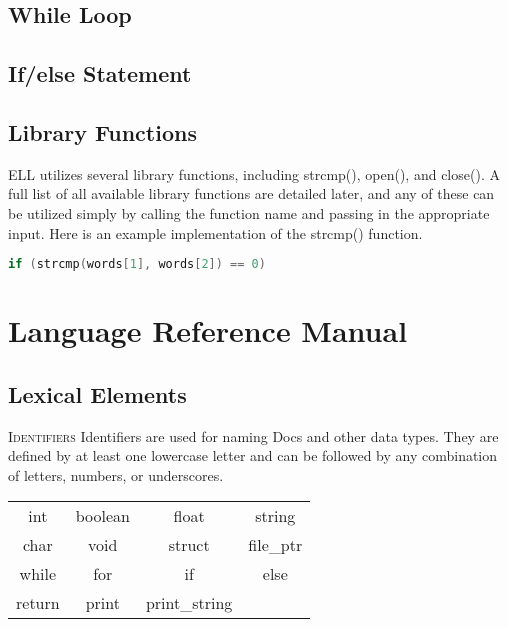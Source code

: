 \documentclass{article}
\begin{document}
\subsection{While Loop}

\subsection{If/else Statement}

\subsection{Library Functions}
ELL utilizes several library functions, including strcmp(), open(), and close(). A full list of all available library functions are detailed later, and any of these can be utilized simply by calling the function name and passing in the appropriate input. Here is an example implementation of the strcmp() function. 
\begin{lstlisting}[language=C]
if (strcmp(words[1], words[2]) == 0)
\end{lstlisting}


\newpage
\section{Language Reference Manual}
\subsection{Lexical Elements}
{\scshape Identifiers} \newline
Identifiers are used for naming Docs and other data types. They are defined by at least one lowercase letter and can be followed by any combination of letters, numbers, or underscores. \newline \newline

 \newline
\begin{center}
\begin{tabular}{ c c c c }
 int & boolean & float & string \\ 
 char & void & struct & file\_ptr \\
 while & for & if & else \\
 return & print & print\_string
 
\end{tabular}
\end{center}
\newline
\end{document}
